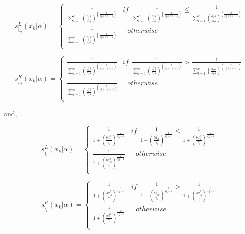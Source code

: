 \documentclass[journal, onecolumn]{IEEEtran}
\begin{document}
\begin{equation}
s_{{\tilde{u}}_i}^L(x_k|\alpha)=
  \begin{cases}
               \frac{1}{\sum_{l=1}^c{(\frac{d_ik}{d_lk})^{(\frac{2}{s_{M}^L(\alpha)-1})}}} & if \:\: \frac{1}{\sum_{l=1}^c{(\frac{d_ik}{d_lk})^{(\frac{2}{s_{M}^L(\alpha)-1})}}} \leq \frac{1}{\sum_{l=1}^c{(\frac{d_ik}{d_lk})^{(\frac{2}{s_{M}^R(\alpha)-1})}}} \\
 \frac{1}{\sum_{l=1}^c{(\frac{d_ik}{d_lk})^{(\frac{2}{s_{M}^R(\alpha)-1})}}} &\:\:\:otherwise \\
 
  \end{cases}
\end{equation}

\begin{equation}
s_{{\tilde{u}}_i}^R(x_k|\alpha)=
  \begin{cases}
               \frac{1}{\sum_{l=1}^c{(\frac{d_ik}{d_lk})^{(\frac{2}{s_{M}^L(\alpha)-1})}}} & if \:\: \frac{1}{\sum_{l=1}^c{(\frac{d_ik}{d_lk})^{(\frac{2}{s_{M}^L(\alpha)-1})}}} > \frac{1}{\sum_{l=1}^c{(\frac{d_ik}{d_lk})^{(\frac{2}{s_{M}^R(\alpha)-1})}}} \\
 \frac{1}{\sum_{l=1}^c{(\frac{d_ik}{d_lk})^{(\frac{2}{s_{M}^R(\alpha)-1})}}} &\:\:\:otherwise \\
 
  \end{cases}
\end{equation}

and, 

\begin{equation}
s_{{\tilde{t}}_i}^L(x_k|\alpha)=
  \begin{cases}
              \frac{1}{1+ (\frac{b d_{ik}^2}{\overline{\gamma_i}})^{\frac{2}{s_H^L-1}}}                     & if \:\: \frac{1}{1+ (\frac{b d_{ik}^2}{\overline{\gamma_i}})^{\frac{2}{s_H^L-1}}} \leq \frac{1}{1+ (\frac{ b d_{ik}^2}{\underline{\gamma_i}})^{\frac{2}{s_H^R-1}}} \\
 \frac{1}{1+ (\frac{b d_{ik}^2}{\underline{\gamma_i}})^{\frac{2}{s_H^R-1}}}  &\:\:\:otherwise \\
 
  \end{cases}
\end{equation}

\begin{equation}
s_{{\tilde{t}}_i}^R(x_k|\alpha)=
  \begin{cases}
              \frac{1}{1+ (\frac{b d_{ik}^2}{\overline{\gamma_i}})^{\frac{2}{s_H^L-1}}}                     & if \:\: \frac{1}{1+ (\frac{b d_{ik}^2}{\overline{\gamma_i}})^{\frac{2}{s_H^L-1}}} > \frac{1}{1+ (\frac{ b d_{ik}^2}{\underline{\gamma_i}})^{\frac{2}{s_H^R-1}}} \\
 \frac{1}{1+ (\frac{b d_{ik}^2}{\underline{\gamma_i}})^{\frac{2}{s_H^R-1}}}  &\:\:\:otherwise \\
 
  \end{cases}
\end{equation}
\end{document}
